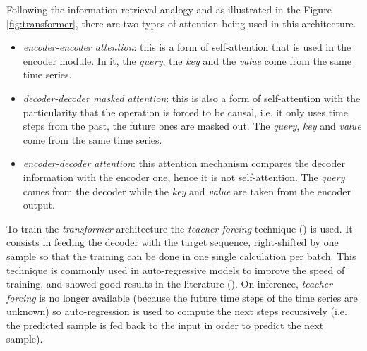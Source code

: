 \documentclass{elsarticle}
\begin{document}
	Following the information retrieval analogy and as illustrated in the Figure \ref{fig:transformer}, there are two types of attention being used in this architecture.
	\begin{itemize}
		\item \textit{encoder-encoder attention}: this is a form of self-attention that is used in the encoder module. In it, the \textit{query}, the \textit{key} and the \textit{value} come from the same time series.
		\item \textit{decoder-decoder masked attention}: this is also a form of self-attention with the particularity that the operation is forced to be causal, i.e. it only uses time steps from the past, the future ones are masked out. The \textit{query}, \textit{key} and \textit{value} come from the same time series.
		\item \textit{encoder-decoder attention}: this attention mechanism compares the decoder information with the encoder one, hence it is not self-attention. The \textit{query} comes from the decoder while the \textit{key} and \textit{value} are taken from the encoder output.
	\end{itemize}
	
	To train the \textit{transformer} architecture the \textit{teacher forcing} technique (\cite{williams1989, goyal2016}) is used. It consists in feeding the decoder with the target sequence, right-shifted by one sample so that the training can be done in one single calculation per batch. This technique is commonly used in auto-regressive models to improve the speed of training, and showed good results in the literature (\cite{vaswani2017}). On inference, \textit{teacher forcing} is no longer available (because the future time steps of the time series are unknown) so auto-regression is used to compute the next steps recursively (i.e. the predicted sample is fed back to the input in order to predict the next sample).
    
\end{document}
